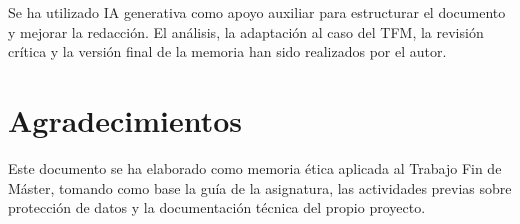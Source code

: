 \documentclass{article}
\begin{document}
Se ha utilizado IA generativa como apoyo auxiliar para estructurar el documento y mejorar la redacción. El análisis, la adaptación al caso del TFM, la revisión crítica y la versión final de la memoria han sido realizados por el autor.

\section*{Agradecimientos}

Este documento se ha elaborado como memoria ética aplicada al Trabajo Fin de Máster, tomando como base la guía de la asignatura, las actividades previas sobre protección de datos y la documentación técnica del propio proyecto.



\end{document}
